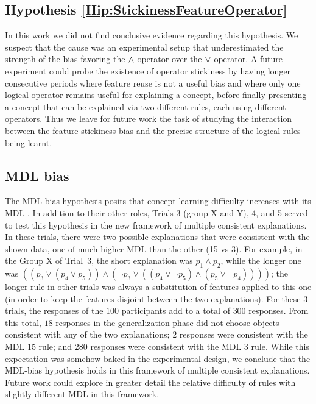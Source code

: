 \subsection{Hypothesis \ref{Hip:StickinessFeatureOperator}} \label{Results:StickinessFeatureOperator} 
In this work we did not find conclusive evidence regarding this hypothesis. %
 We suspect that the cause was an experimental setup that underestimated the strength of the bias favoring the $\land$ operator over the $\lor$ operator. A future experiment could probe the existence of operator stickiness by having longer consecutive periods where feature reuse is not a useful bias and where only one logical operator remains useful for explaining a concept, before finally presenting a concept that can be explained via two different rules, each using different operators. Thus we leave for future work the task of studying the interaction between the feature stickiness bias and the precise structure of the logical rules being learnt. 



\subsection{MDL bias} \label{Resultados:MDLbias} 

The MDL-bias hypothesis posits that concept learning difficulty increases with its MDL \cite{feldman2000minimization}. %
In addition to their other roles, Trials 3 (group X and Y), 4, and 5 served to test this hypothesis in the new framework of multiple consistent explanations. In these trials, there were two possible explanations that were consistent with the shown data, one of much higher MDL than the other (15 vs 3). For example, in the Group X of Trial~3, the short explanation was $p_1 \land p_2$, while the longer one was $((p_3 \lor (p_4 \lor p_5))\land(\lnot p_3 \lor ((p_4 \lor \lnot p_5)\land (p_5 \lor \lnot p_4))))$; the longer rule in other trials was always a substitution of features applied to this one (in order to keep the features disjoint between the two explanations). For these 3 trials, the responses of the $100$ participants add to a total of $300$ responses. From this total, $18$ responses in the generalization phase did not choose objects consistent with any of the two explanations; $2$ responses were consistent with the MDL 15 rule; and $280$ responses were consistent with the MDL 3 rule. While this expectation was somehow baked in the experimental design, we conclude that the MDL-bias hypothesis holds in this framework of multiple consistent explanations. Future work could explore in greater detail the relative difficulty of rules with slightly different MDL in this framework.


